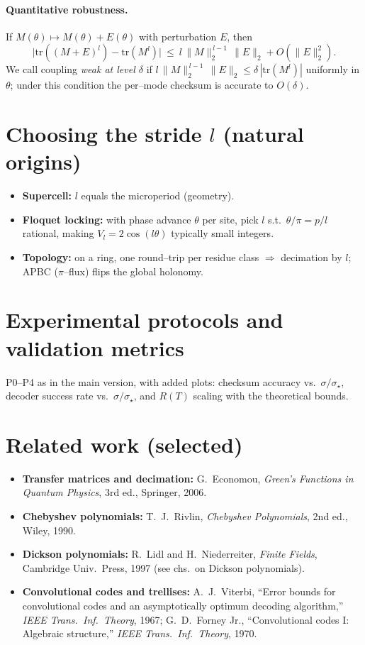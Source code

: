 \documentclass[11pt]{article}
\theoremstyle{definition}
\theoremstyle{remark}
\newcommand{\tr}{\mathrm{tr}}
\begin{document}
\paragraph{Quantitative robustness.}
If $M(\theta)\mapsto M(\theta)+E(\theta)$ with perturbation $E$, then
\begin{equation}
\big|\tr((M+E)^l)-\tr(M^l)\big| \ \le\ l\,\|M\|_2^{\,l-1}\,\|E\|_2 + O(\|E\|_2^2).
\end{equation}
We call coupling \emph{weak at level $\delta$} if $l\,\|M\|_2^{\,l-1}\,\|E\|_2\le \delta\,|\tr(M^l)|$ uniformly in $\theta$;
under this condition the per--mode checksum is accurate to $O(\delta)$.

\section{Choosing the stride $l$ (natural origins)}
\begin{itemize}
\item \textbf{Supercell:} $l$ equals the microperiod (geometry).
\item \textbf{Floquet locking:} with phase advance $\theta$ per site, pick $l$ s.t.\ $\theta/\pi=p/l$ rational, making $V_l=2\cos(l\theta)$ typically small integers.
\item \textbf{Topology:} on a ring, one round--trip per residue class $\Rightarrow$ decimation by $l$; APBC ($\pi$--flux) flips the global holonomy.
\end{itemize}

\section{Experimental protocols and validation metrics}
P0--P4 as in the main version, with added plots: checksum accuracy vs.\ $\sigma/\sigma_\star$, decoder success rate vs.\ $\sigma/\sigma_\star$, and $R(T)$ scaling with the theoretical bounds.

\section{Related work (selected)}
\begin{itemize}
\item \textbf{Transfer matrices and decimation:} G.\ Economou, \emph{Green's Functions in Quantum Physics}, 3rd ed., Springer, 2006.
\item \textbf{Chebyshev polynomials:} T.\ J.\ Rivlin, \emph{Chebyshev Polynomials}, 2nd ed., Wiley, 1990.
\item \textbf{Dickson polynomials:} R.\ Lidl and H.\ Niederreiter, \emph{Finite Fields}, Cambridge Univ.\ Press, 1997 (see chs.\ on Dickson polynomials).
\item \textbf{Convolutional codes and trellises:} A.\ J.\ Viterbi, ``Error bounds for convolutional codes and an asymptotically optimum decoding algorithm,'' \emph{IEEE Trans.\ Inf.\ Theory}, 1967; G.\ D.\ Forney Jr., ``Convolutional codes I: Algebraic structure,'' \emph{IEEE Trans.\ Inf.\ Theory}, 1970.
\end{itemize}
\end{document}
